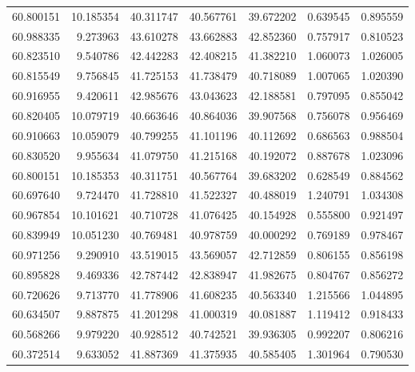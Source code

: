 \begin{tabular}{rrrrrrr}
 60.800151 &  10.185354 &         40.311747 &         40.567761 &         39.672202 &  0.639545 &  0.895559 \\
 60.988335 &   9.273963 &         43.610278 &         43.662883 &         42.852360 &  0.757917 &  0.810523 \\
 60.823510 &   9.540786 &         42.442283 &         42.408215 &         41.382210 &  1.060073 &  1.026005 \\
 60.815549 &   9.756845 &         41.725153 &         41.738479 &         40.718089 &  1.007065 &  1.020390 \\
 60.916955 &   9.420611 &         42.985676 &         43.043623 &         42.188581 &  0.797095 &  0.855042 \\
 60.820405 &  10.079719 &         40.663646 &         40.864036 &         39.907568 &  0.756078 &  0.956469 \\
 60.910663 &  10.059079 &         40.799255 &         41.101196 &         40.112692 &  0.686563 &  0.988504 \\
 60.830520 &   9.955634 &         41.079750 &         41.215168 &         40.192072 &  0.887678 &  1.023096 \\
 60.800151 &  10.185353 &         40.311751 &         40.567764 &         39.683202 &  0.628549 &  0.884562 \\
 60.697640 &   9.724470 &         41.728810 &         41.522327 &         40.488019 &  1.240791 &  1.034308 \\
 60.967854 &  10.101621 &         40.710728 &         41.076425 &         40.154928 &  0.555800 &  0.921497 \\
 60.839949 &  10.051230 &         40.769481 &         40.978759 &         40.000292 &  0.769189 &  0.978467 \\
 60.971256 &   9.290910 &         43.519015 &         43.569057 &         42.712859 &  0.806155 &  0.856198 \\
 60.895828 &   9.469336 &         42.787442 &         42.838947 &         41.982675 &  0.804767 &  0.856272 \\
 60.720626 &   9.713770 &         41.778906 &         41.608235 &         40.563340 &  1.215566 &  1.044895 \\
 60.634507 &   9.887875 &         41.201298 &         41.000319 &         40.081887 &  1.119412 &  0.918433 \\
 60.568266 &   9.979220 &         40.928512 &         40.742521 &         39.936305 &  0.992207 &  0.806216 \\
 60.372514 &   9.633052 &         41.887369 &         41.375935 &         40.585405 &  1.301964 &  0.790530 \\

\end{tabular}

